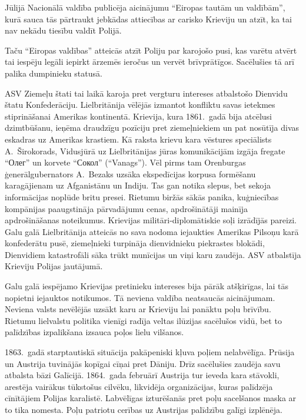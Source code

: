 \documentclass[twoside,a5paper,12pt,fleqn,openany]{extbook}
\newcommand{\rutxti}[1]{\textrussian{#1}}
\begin{document}
Jūlijā Nacionālā valdība publicēja aicinājumu ``Eiropas tautām un valdībām'', kurā sauca tās pārtraukt jebkādas attiecības ar carisko Krieviju un atzīt, ka tai nav nekādu tiesību valdīt Polijā.

Taču ``Eiropas valdības'' atteicās atzīt Poliju par karojošo pusi, kas varētu atvērt tai iespēju legāli iepirkt ārzemēs ieročus un vervēt brīvprātīgos. Sacēlušies tā arī palika dumpinieku statusā.

ASV Ziemeļu štati tai laikā karoja pret vergturu intereses atbalstošo Dienvidu štatu Konfederāciju. Lielbritānija vēlējās izmantot konfliktu savas ietekmes stiprināšanai Amerikas kontinentā. Krievija, kura 1861.~gadā bija atcēlusi dzimtbūšanu, ieņēma draudzīgu pozīciju pret ziemeļniekiem un pat nosūtīja divas eskadras uz Amerikas krastiem. Kā raksta krievu kara vēstures speciālists A.~Širokorads, Vidusjūrā uz Lielbritānijas jūras komunikācijām izgāja fregate ``\rutxti{Олег}'' un korvete ``\rutxti{Сокол}'' (``Vanags''). Vēl pirms tam Orenburgas ģenerālgubernators A.~Bezaks uzsāka ekspedīcijas korpusa formēšanu karagājienam uz Afganistānu un Indiju. Tas gan notika slepus, bet sekoja informācijas noplūde britu presei. Rietumu biržās sākās panika, kuģniecības kompānijas paaugstināja pārvadājumu cenas, apdrošinātāji mainīja apdrošināšanas noteikumus. Krievijas militāri-diplomātiskie soļi izrādījās pareizi. Galu galā Lielbritānija atteicās no sava nodoma iejaukties Amerikas Pilsoņu karā konfederātu pusē, ziemeļnieki turpināja dienvidnieku piekrastes blokādi, Dienvidiem katastrofāli sāka trūkt munīcijas un viņi karu zaudēja. ASV atbalstīja Krieviju Polijas jautājumā.

Galu galā iespējamo Krievijas pretinieku intereses bija pārāk atšķirīgas, lai tās nopietni iejauktos notikumos. Tā neviena valdība neatsaucās aicinājumam. Neviena valsts nevēlējās uzsākt karu ar Krieviju lai panāktu poļu brīvību. Rietumu lielvalstu politika vienīgi radīja veltas ilūzijas sacēlušos vidū, bet to palīdzības izpalikšana izsauca poļos lielu vilšanos.

1863.~gadā starptautiskā situācija pakāpeniski kļuva poļiem nelabvēlīga. Prūsija un Austrija tuvinājās kopīgai cīņai pret Dāniju. Drīz sacēlušies zaudēja savu atbalsta bāzi Galīcijā. 1864.~gada februārī Austrija tur ieveda kara stāvokli, arestēja vairākus tūkstošus cilvēku, likvidēja organizācijas, kuras palīdzēja cīnītājiem Polijas karalistē. Labvēlīgas izturēšanās pret poļu sacelšanos maska ar to tika nomesta. Poļu patriotu cerības uz Austrijas palīdzību galīgi izplēnēja.
\end{document}
